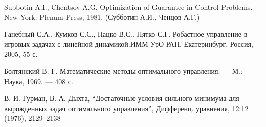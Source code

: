 \documentclass[../main.tex]{subfiles}
\begin{document}
\begin{thebibliography}{99}
Subbotin A.I., Chentsov A.G. Optimization of Guarantee in Control Problems. — New York: Plenum Press, 1981. (Субботин А.И., Ченцов А.Г.)

Ганебный С.А., Кумков С.С., Пацко В.С., Пятко С.Г.
Робастное управление в игровых задачах с линейной
динамикой:ИММ УрО РАН. Екатеринбург, Россия, 2005, 55 с.

Болтянский В. Г. Математические методы оптимального управления. — М.: Наука, 1969. — 408 с.

В. И. Гурман, В. А. Дыхта, “Достаточные условия сильного минимума для вырожденных задач оптимального управления”, Дифференц. уравнения, 12:12 (1976), 2129–2138






%







\end{thebibliography}
\end{document}
